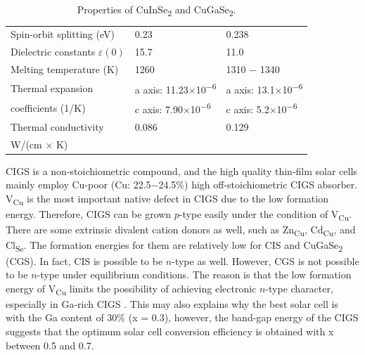 \documentclass[a4paper, 12pt, titlepage,oneside,drop]{kthesis}
\begin{document}
\begin {table}[!htb]
\begin{tabular}{l l l}
\rowcolor[gray]{0.9}
Spin-orbit splitting (eV) & 0.23 \cite{madelung2004semiconductors}& 0.238 \cite{madelung2004semiconductors} \\ 
Dielectric constants $\varepsilon(0)$ & 15.7 \cite{madelung2004semiconductors} & 11.0 \cite{rau2006wide}\\
\rowcolor[gray]{0.9}
Melting temperature (K)& 1260 \cite{madelung2004semiconductors} & 1310 $-$ 1340 \cite{madelung2004semiconductors}\\
Thermal expansion & a axis: 11.23$\times$10\textsuperscript{$-$6} \cite{madelung2004semiconductors}& a axis: 13.1$\times$10\textsuperscript{$-$6} \cite{madelung2004semiconductors}\\
 coefficients (1/K) & c axis: 7.90$\times$10\textsuperscript{$-$6} \cite{madelung2004semiconductors}&c axis: 5.2$\times$10\textsuperscript{$-$6} \cite{madelung2004semiconductors}\\ 
\rowcolor[gray]{0.9}
Thermal conductivity& 0.086 \cite{neumann1986optical} & 0.129 \cite{madelung2004semiconductors} \\ 
 \rowcolor[gray]{0.9} W/(cm $\times$ K)&  & \\ 
\bottomrule
\end{tabular}
\caption {Properties of CuInSe\textsubscript{2} and CuGaSe\textsubscript{2}.}
\label{kth518}
\end{table}



CIGS is a non-stoichiometric compound, and the high quality thin-film solar cells mainly employ Cu-poor (Cu: 22.5$-$24.5\%) high off-stoichiometric CIGS absorber.
V\textsubscript{Cu} is the most important native defect in CIGS due to the low formation energy. Therefore, CIGS can be grown $p$-type easily under the condition of V\textsubscript{Cu}.
There are some extrinsic divalent cation donors as well, such as Zn\textsubscript{Cu}, Cd\textsubscript{Cu}, and Cl\textsubscript{Se}. The formation energies 
for them are relatively low for CIS and CuGaSe\textsubscript{2} (CGS). In fact, CIS is possible to be $n$-type as well. However, CGS is not possible to be $n$-type under equilibrium conditions. The reason is that the low formation energy of
V\textsubscript{Cu} limits the possibility of achieving electronic $n$-type character, especially in Ga-rich CIGS \cite{persson2005n, zhao2004can}. This may also explains why the best solar cell is with 
the Ga content of 30\% (x = 0.3), however,
the band-gap energy of the CIGS suggests that the optimum solar cell conversion efficiency is obtained with x between 0.5 and 0.7.
\end{document}
